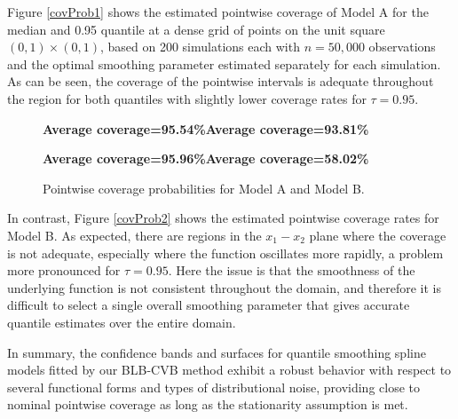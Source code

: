 \documentclass{statsoc}
\begin{document}
Figure \ref{covProb1} shows the estimated pointwise coverage of Model A for the median and 0.95 quantile at a dense grid of points on the unit square $(0,1) \times (0,1)$, based on 200 simulations each with $n=50,000$ observations and the optimal smoothing parameter estimated separately for each simulation. As can be seen, the coverage of the pointwise intervals is adequate throughout the region for both quantiles with slightly lower coverage rates for $\tau=0.95$.
\begin{figure}
\centering   
 {\bf\scriptsize \qquad Average coverage=95.54\%\qquad\quad\qquad\quad\quad\quad Average coverage=93.81\%\qquad\qquad}
 
 \vskip 0.5cm
 {\bf\scriptsize \qquad Average coverage=95.96\%\qquad\quad\qquad\quad\quad\quad Average coverage=58.02\%\qquad\qquad}
   
\caption{Pointwise coverage probabilities for Model A and Model B.}
\label{fig:covProb}
\end{figure}

In contrast, Figure \ref{covProb2} shows the estimated pointwise coverage rates for Model B. As expected, there are regions in the $x_1-x_2$ plane where the coverage is not adequate, especially where the function oscillates more rapidly, a problem more pronounced for $\tau=0.95$. Here the issue is that the smoothness of the underlying function is not consistent throughout the domain, and therefore it is difficult to select a  {single overall} smoothing parameter that gives accurate quantile estimates over the entire domain.  

In summary, the confidence bands and surfaces for quantile smoothing spline models fitted by our BLB-CVB method exhibit a robust behavior with respect to several functional forms and types of distributional noise, providing close to nominal pointwise coverage  {as long as the stationarity assumption is met.}
\end{document}
